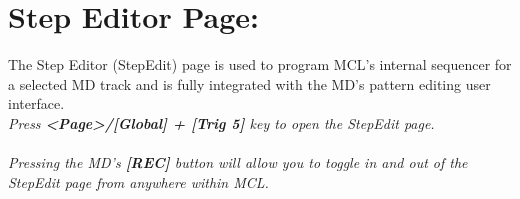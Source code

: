 \chapter{Step Editor Page:}
The Step Editor (StepEdit) page is used to program MCL's internal sequencer for a selected MD track and is fully integrated with the MD's pattern editing user interface.
\\
\textit{Press \textbf{<Page>/[Global] + [Trig 5]} key to open the StepEdit page.}\\\\
\textit{Pressing the MD's \textbf{[REC]} button will allow you to toggle in and out of the StepEdit page from anywhere within MCL.}

\newpage
